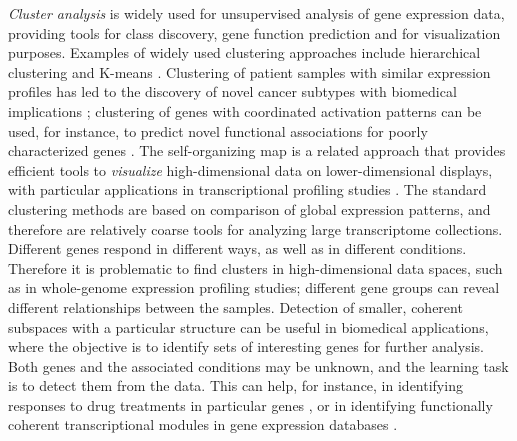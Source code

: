 {\it Cluster analysis} is widely used for unsupervised analysis of
gene expression data, providing tools for class discovery, gene
function prediction and for visualization purposes. Examples of widely
used clustering approaches include hierarchical clustering and K-means
\citep[see e.g.][]{Polanski07}. Clustering of patient samples with
similar expression profiles has led to the discovery of novel cancer
subtypes with biomedical implications \citep{Sorlie01}; clustering of
genes with coordinated activation patterns can be used, for instance,
to predict novel functional associations for poorly characterized
genes \citep{Allocco04}. The self-organizing map \citep{Kohonen82,
  Kohonen01} is a related approach that provides efficient tools to
{\it visualize} high-dimensional data on lower-dimensional displays,
with particular applications in transcriptional profiling studies
\citep{Tamayo99, Toronen99}.  The standard clustering methods are
based on comparison of global expression patterns, and therefore are
relatively coarse tools for analyzing large transcriptome collections.
Different genes respond in different ways, as well as in different
conditions.  Therefore it is problematic to find clusters in
high-dimensional data spaces, such as in whole-genome expression
profiling studies; different gene groups can reveal different
relationships between the samples. Detection of smaller, coherent
subspaces with a particular structure can be useful in biomedical applications, 
where the objective is to identify sets of interesting genes for further analysis. 
Both genes and the associated conditions may be unknown, and
the learning task is to detect them from the data. This can help, for
instance, in identifying responses to drug treatments in particular genes
\citep{Ihmels02, Tanay02bioinf}, or in identifying functionally coherent
transcriptional modules in gene expression databases
\citep{Segal04nature, Tanay05msb}.

